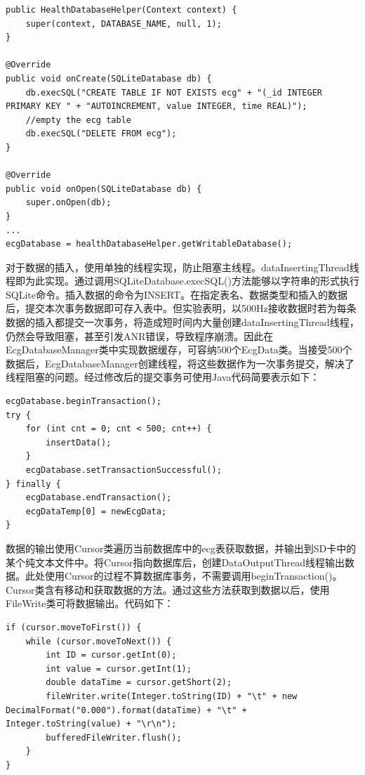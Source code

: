 \begin{center}
\begin{lstlisting}
public HealthDatabaseHelper(Context context) {
    super(context, DATABASE_NAME, null, 1);
}

@Override
public void onCreate(SQLiteDatabase db) {
    db.execSQL("CREATE TABLE IF NOT EXISTS ecg" + "(_id INTEGER PRIMARY KEY " + "AUTOINCREMENT, value INTEGER, time REAL)");
    //empty the ecg table
    db.execSQL("DELETE FROM ecg");
}

@Override
public void onOpen(SQLiteDatabase db) {
    super.onOpen(db);
}
...
ecgDatabase = healthDatabaseHelper.getWritableDatabase();
\end{lstlisting}
\end{center}

对于数据的插入，使用单独的线程实现，防止阻塞主线程。dataInsertingThread线程即为此实现。通过调用SQLiteDatabase.execSQL()方法能够以字符串的形式执行SQLite命令。插入数据的命令为INSERT。在指定表名、数据类型和插入的数据后，提交本次事务数据即可存入表中。但实验表明，以500Hz接收数据时若为每条数据的插入都提交一次事务，将造成短时间内大量创建dataInsertingThread线程，仍然会导致阻塞，甚至引发ANR错误，导致程序崩溃。因此在EcgDatabaseManager类中实现数据缓存，可容纳500个EcgData类。当接受500个数据后，EcgDatabaseManager创建线程，将这些数据作为一次事务提交，解决了线程阻塞的问题。经过修改后的提交事务可使用Java代码简要表示如下：
\begin{center}
\begin{lstlisting}
ecgDatabase.beginTransaction();
try {
    for (int cnt = 0; cnt < 500; cnt++) {
        insertData();
    }
    ecgDatabase.setTransactionSuccessful();
} finally {
    ecgDatabase.endTransaction();
    ecgDataTemp[0] = newEcgData;
}
\end{lstlisting}
\end{center}

数据的输出使用Cursor类遍历当前数据库中的ecg表获取数据，并输出到SD卡中的某个纯文本文件中。将Cursor指向数据库后，创建DataOutputThread线程输出数据。此处使用Cursor的过程不算数据库事务，不需要调用beginTransaction()。Cursor类含有移动和获取数据的方法。通过这些方法获取到数据以后，使用FileWrite类可将数据输出。代码如下：

\begin{center}
\begin{lstlisting}
if (cursor.moveToFirst()) {
    while (cursor.moveToNext()) {
        int ID = cursor.getInt(0);
        int value = cursor.getInt(1);
        double dataTime = cursor.getShort(2);
        fileWriter.write(Integer.toString(ID) + "\t" + new DecimalFormat("0.000").format(dataTime) + "\t" + Integer.toString(value) + "\r\n");
        bufferedFileWriter.flush();
    }
}
\end{lstlisting}
\end{center}

